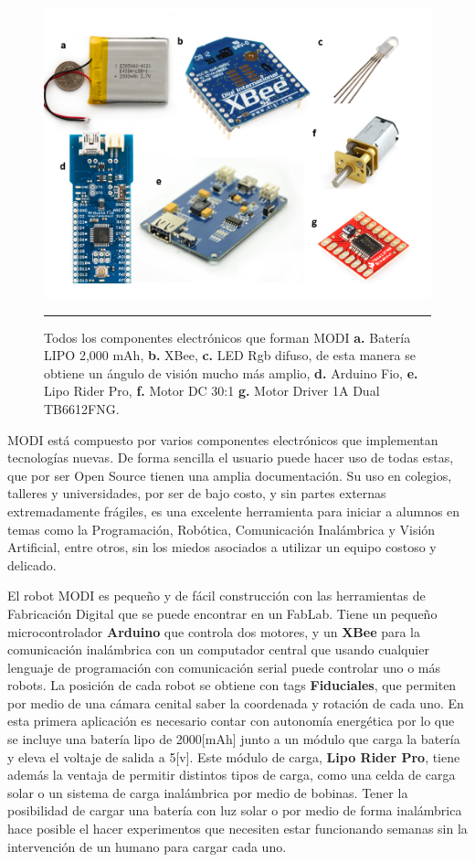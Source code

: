 \begin{figure}[htbp]
	\centering
		\includegraphics[width=\textwidth]{./Figures/MODI/compElo.png}
		\rule{35em}{0.5pt}
	\caption[Componentes Electrónicos]{Todos los componentes electrónicos que forman MODI \textbf{ a.} Batería LIPO 2,000 mAh, \textbf{b.} XBee, \textbf{c.} LED Rgb difuso, de esta manera se obtiene un ángulo de visión mucho más amplio, \textbf{d.} Arduino Fio, \textbf{e.} Lipo Rider Pro,\textbf{ f.} Motor DC 30:1 \textbf{g.} Motor Driver 1A Dual TB6612FNG.}
	\label{fig:compELO}
\end{figure}

MODI está compuesto por varios componentes electrónicos que implementan tecnologías nuevas. De forma sencilla el usuario puede hacer uso de todas estas, que por ser Open Source tienen una amplia documentación. Su uso en colegios, talleres y universidades, por ser de bajo costo, y sin partes externas extremadamente frágiles, es una excelente herramienta para iniciar a alumnos en temas como la Programación, Robótica, Comunicación Inalámbrica y Visión Artificial, entre otros, sin los miedos asociados a utilizar un equipo costoso y delicado.

El robot MODI es pequeño y de fácil construcción con las herramientas de Fabricación Digital que se puede encontrar en un FabLab. Tiene un pequeño microcontrolador \textbf{Arduino} que controla dos motores, y un \textbf{XBee} para la comunicación inalámbrica con un computador central que usando cualquier lenguaje de programación con comunicación serial puede controlar uno o más robots. La posición de cada robot se obtiene con tags \textbf{Fiduciales}, que permiten por medio de una cámara cenital saber la coordenada y rotación de cada uno. En esta primera aplicación es necesario contar con autonomía energética por lo que se incluye una batería lipo de 2000[mAh] junto a un módulo que carga la batería y eleva el voltaje de salida a 5[v]. Este módulo de carga, \textbf{Lipo Rider Pro}, tiene además la ventaja de permitir distintos tipos de carga, como una celda de carga solar o un sistema de carga inalámbrica por medio de bobinas. Tener la posibilidad de cargar una batería con luz solar o por medio de forma inalámbrica hace posible el hacer experimentos que necesiten estar funcionando semanas sin la intervención de un humano para cargar cada uno.

